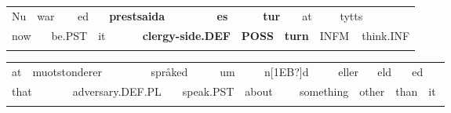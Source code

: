 \begin{tabular}{llllllllllllllll}
\lsptoprule
Nu & \multicolumn{2}{l}{war

} & \multicolumn{2}{l}{ed

} & \multicolumn{2}{l}{{\bfseries prestsaida}

} & \multicolumn{2}{l}{{\bfseries es}

} & \multicolumn{2}{l}{{\bfseries tur}

} & \multicolumn{2}{l}{at

} & \multicolumn{2}{l}{tytts

} & \\
\multicolumn{2}{l}{now

} & \multicolumn{2}{l}{be.PST

} & \multicolumn{2}{l}{it

} & \multicolumn{2}{l}{{\bfseries clergy-side.DEF}

} & \multicolumn{2}{l}{{\bfseries POSS}

} & \multicolumn{2}{l}{{\bfseries turn}

} & \multicolumn{2}{l}{INFM

} & \multicolumn{2}{l}{think.INF

}\\
\lspbottomrule
\end{tabular}

\begin{tabular}{llllllllllllllll}
\lsptoprule
at & \multicolumn{2}{l}{muotstonderer

} & \multicolumn{2}{l}{språked

} & \multicolumn{2}{l}{um

} & \multicolumn{2}{l}{n[1EB?]d

} & \multicolumn{2}{l}{eller

} & \multicolumn{2}{l}{eld

} & \multicolumn{2}{l}{ed

} & \\
\multicolumn{2}{l}{that

} & \multicolumn{2}{l}{adversary.DEF.PL

} & \multicolumn{2}{l}{speak.PST

} & \multicolumn{2}{l}{about

} & \multicolumn{2}{l}{something

} & \multicolumn{2}{l}{other

} & \multicolumn{2}{l}{than

} & \multicolumn{2}{l}{it

}\\
\lspbottomrule
\end{tabular}

